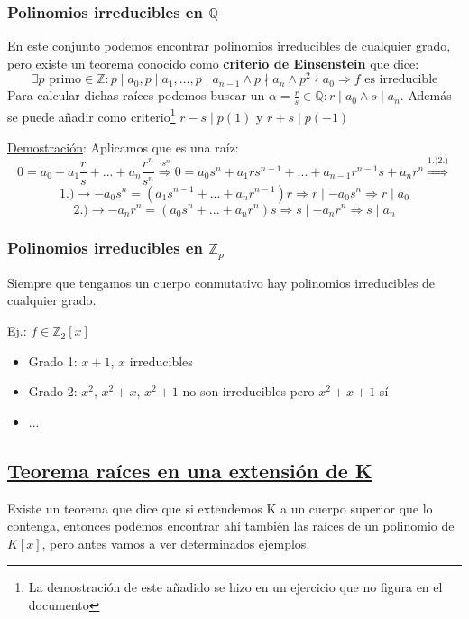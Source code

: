 \documentclass[10pt,a4paper,openright]{book}
\begin{document}
\subsubsection*{Polinomios irreducibles en $\mathbb Q$}
En este conjunto podemos encontrar polinomios irreducibles de cualquier grado, pero existe un teorema conocido como \textbf{criterio de Einsenstein} que dice:
$$\exists p\mbox{ primo}\in \mathbb Z: p\mid a_0, p\mid a_1,..., p\mid a_{n-1}\wedge p\nmid a_n \wedge p^2\nmid a_0\Rightarrow f\mbox{ es irreducible}$$
Para calcular dichas raíces podemos buscar un $\alpha=\frac{r}{s}\in \mathbb Q: r\mid a_0\wedge s\mid a_n$. Además se puede añadir como criterio\footnote{La demostración de este añadido se hizo en un ejercicio que no figura en el documento} $r-s\mid p(1)$ y $r+s\mid p(-1)$\par
\underline{Demostración}:
Aplicamos que es una raíz:
$$0=a_0+a_1\frac{r}{s}+...+a_n\frac{r^n}{s^n}\stackrel{\cdot s^n}{\Rightarrow}0=a_0s^n+a_1rs^{n-1}+...+a_{n-1}r^{n-1}s+a_nr^n\stackrel{1.)2.)}{\Rightarrow}$$
$$\mbox{1.)}\rightarrow -a_0s^n=(a_1s^{n-1}+...+a_nr^{n-1})r\Rightarrow r\mid -a_0s^n\Rightarrow r\mid a_0$$
$$\mbox{2.)}\rightarrow -a_nr^n=(a_0s^n+...+a_nr^{n})s\Rightarrow s\mid -a_nr^n\Rightarrow s\mid a_n$$

\subsubsection*{Polinomios irreducibles en $\mathbb Z_p$}
Siempre que tengamos un cuerpo conmutativo hay polinomios irreducibles de cualquier grado.\par
Ej.: $f\in \mathbb Z_2[x]$
\begin{itemize}
\item Grado 1: $x+1$, $x$ irreducibles
\item Grado 2: $x^2$, $x^2+x$, $x^2+1$ no son irreducibles pero $x^2+x+1$ sí
\item ...
\end{itemize}

\subsection*{\underline{Teorema raíces en una extensión de K}}
Existe un teorema que dice que si extendemos K a un cuerpo superior que lo contenga, entonces podemos encontrar ahí también las raíces de un polinomio de $K[x]$, pero antes vamos a ver determinados ejemplos.
\end{document}
